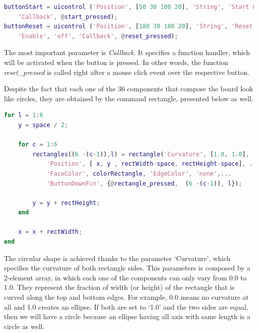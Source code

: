 \begin{lstlisting}[language=Matlab]
% Adds start and reset buttons
buttonStart = uicontrol ('Position', [50 30 100 20], 'String', 'Start Game', ...
    'Callback', @start_pressed);
buttonReset = uicontrol ('Position', [180 30 100 20], 'String', 'Reset Game', ...
    'Enable', 'off', 'Callback', @reset_pressed);
\end{lstlisting}

\vspace{10pt}

The most important parameter is \textit{Callback}. It specifies a function
handler, which will be activated when the button is pressed. In other words,
the function \textit{reset\_pressed} is called right after a mouse click event
over the respective button. 

\vspace{10pt}
 
Despite the fact that each one of the 36 components that compose the board look
like circles, they are obtained by the command rectangle, presented below as well.

\vspace{10pt}

\begin{lstlisting}[language=Matlab]
for l = 1:6
    y = space / 2;
    
    for c = 1:6
        rectangles((6 -(c-1)),l) = rectangle('Curvature', [1.0, 1.0], ...
            'Position', [ x, y , rectWidth-space, rectHeight-space], ...
            'FaceColor', colorRectangle, 'EdgeColor', 'none',...
            'ButtonDownFcn', {@rectangle_pressed,  (6 -(c-1)), l});
        
        y = y + rectHeight;
    end
    
    x = x + rectWidth;
end
\end{lstlisting}

\vspace{10pt}

The circular shape is achieved thanks to the parameter ‘Curvature’, which
specifies the curvature of both rectangle sides. This parameters is composed by
a 2-element array, in which each one of the components can only vary from 0.0
to 1.0. They represent the fraction of width (or height) of the rectangle that
is curved along the top and bottom edges. For example, 0.0 means no curvature
at all and 1.0 creates an ellipse. If both are set to ‘1.0’ and the two sides
are equal, then we will have a circle because an ellipse having all axis with
same length is a circle as well.


